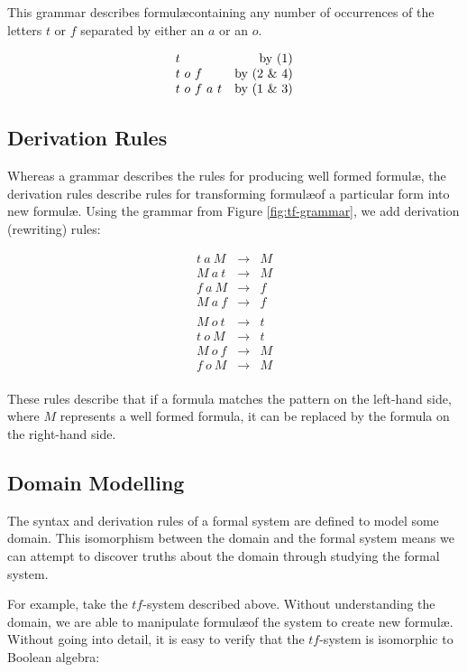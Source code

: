 This grammar describes formul\ae containing any number of occurrences of the letters $t$ or $f$ separated by either an $a$ or an $o$.

\[
\begin{array}{lr}
  t & \text{by (1)} \\
  t\ o\ f & \text{by (2 \& 4)} \\
  t\ o\ f\ a\ t & \text{by (1 \& 3)}
\end{array}
\]

\subsection{Derivation Rules}
Whereas a grammar describes the rules for producing well formed formul\ae,
the derivation rules describe rules for transforming formul\ae of a particular form into new formul\ae. 
Using the grammar from Figure \ref{fig:tf-grammar}, we add derivation (rewriting) rules:

\[
\begin{array}{lcl}
  t\ a\ M &\to& M \\ 
  M\ a\ t &\to& M \\
  f\ a\ M &\to& f \\
  M\ a\ f &\to& f \\
  \\
  M\ o\ t &\to& t \\ 
  t\ o\ M &\to& t \\
  M\ o\ f &\to& M \\
  f\ o\ M &\to& M \\
\end{array}
\]

These rules describe that if a formula matches the pattern on the 
left-hand side, where $M$ represents a well formed formula, it can be
replaced by the formula on the right-hand side.

\subsection{Domain Modelling}

The syntax and derivation rules of a formal system are defined to model 
some domain. This isomorphism between the domain and the formal system
means we can attempt to discover truths about the domain through studying
the formal system.

For example, take the $tf$-system described above. 
Without understanding the domain, we are able to manipulate formul\ae of the system to create new formul\ae. 
Without going into detail, it is easy to verify that the $tf$-system is isomorphic to Boolean algebra:

